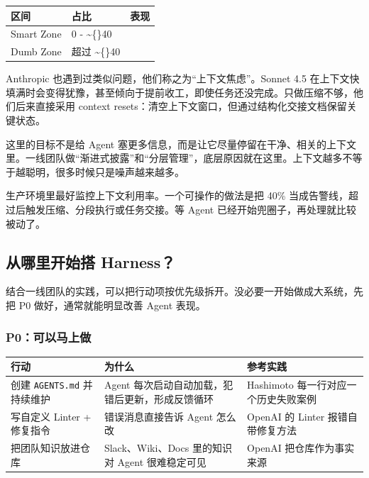 \documentclass[10pt,a4paper]{ctexart}
\begin{document}
{\footnotesize
\begin{tabularx}{\textwidth}{|X|X|X|}
\hline
\textbf{区间} & \textbf{占比} & \textbf{表现} \\
\hline
Smart Zone & 0 - \textasciitilde\{\}40\\%
\hline
Dumb Zone & 超过 \textasciitilde\{\}40\\%
\hline
\end{tabularx}
}



Anthropic 也遇到过类似问题，他们称之为“上下文焦虑”。Sonnet 4.5 在上下文快填满时会变得犹豫，甚至倾向于提前收工，即使任务还没完成。只做压缩不够，他们后来直接采用 context resets：清空上下文窗口，但通过结构化交接文档保留关键状态。



这里的目标不是给 Agent 塞更多信息，而是让它尽量停留在干净、相关的上下文里。一线团队做“渐进式披露”和“分层管理”，底层原因就在这里。上下文越多不等于越聪明，很多时候只是噪声越来越多。



生产环境里最好监控上下文利用率。一个可操作的做法是把 40\% 当成告警线，超过后触发压缩、分段执行或任务交接。等 Agent 已经开始兜圈子，再处理就比较被动了。



\subsection{从哪里开始搭 Harness？}


结合一线团队的实践，可以把行动项按优先级拆开。没必要一开始做成大系统，先把 P0 做好，通常就能明显改善 Agent 表现。



\subsubsection{P0：可以马上做}

{\footnotesize
\begin{tabularx}{\textwidth}{|X|X|X|}
\hline
\textbf{行动} & \textbf{为什么} & \textbf{参考实践} \\
\hline
创建 \texttt{AGENTS.md} 并持续维护 & Agent 每次启动自动加载，犯错后更新，形成反馈循环 & Hashimoto 每一行对应一个历史失败案例 \\
\hline
写自定义 Linter + 修复指令 & 错误消息直接告诉 Agent 怎么改 & OpenAI 的 Linter 报错自带修复方法 \\
\hline
把团队知识放进仓库 & Slack、Wiki、Docs 里的知识对 Agent 很难稳定可见 & OpenAI 把仓库作为事实来源 \\
\hline
\end{tabularx}
}
\end{document}
